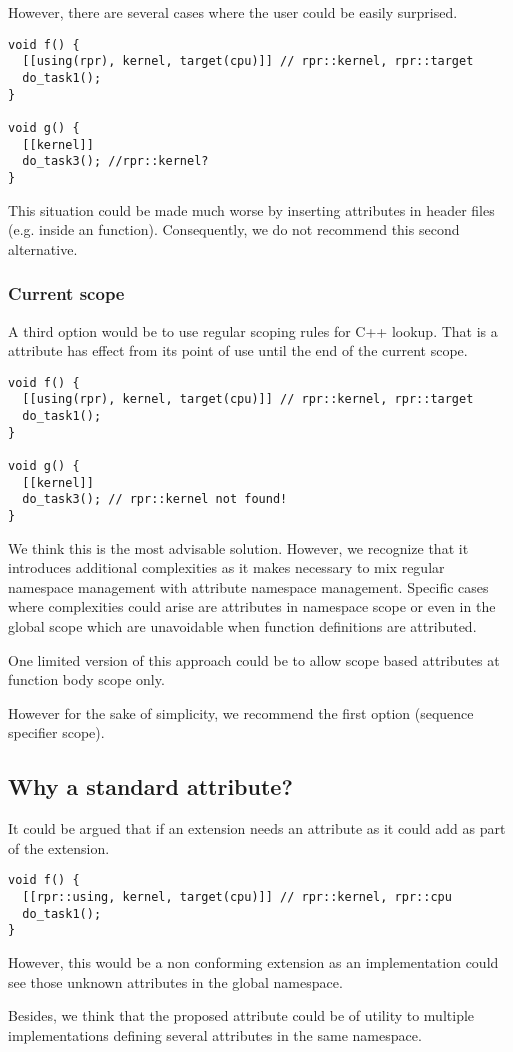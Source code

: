 However, there are several cases where the user could be easily surprised.

\begin{lstlisting}
void f() {
  [[using(rpr), kernel, target(cpu)]] // rpr::kernel, rpr::target
  do_task1();
}

void g() {
  [[kernel]]
  do_task3(); //rpr::kernel?
}
\end{lstlisting}

This situation could be made much worse by inserting  attributes
in header files (e.g. inside an  function). Consequently, we
do not recommend this second alternative.

\subsubsection{Current scope}

A third option would be to use regular scoping rules for C++ lookup. That is
a  attribute has effect from its point of use until the end of
the current scope.

\begin{lstlisting}
void f() {
  [[using(rpr), kernel, target(cpu)]] // rpr::kernel, rpr::target
  do_task1();
}

void g() {
  [[kernel]]
  do_task3(); // rpr::kernel not found!
}
\end{lstlisting}

We think this is the most advisable solution. However, we recognize that it introduces
additional complexities as it makes necessary to mix regular namespace management
with attribute namespace management. Specific cases where complexities could arise
are attributes in namespace scope or even in the global scope 
which are unavoidable when function definitions are attributed.

One limited version of this approach could be to allow scope based 
attributes at function body scope only.

However for the sake of simplicity, we recommend the first option (sequence specifier scope).

\subsection{Why a standard attribute?}

It could be argued that if an extension needs an attribute as  it could add
as part of the extension.

\begin{lstlisting}
void f() {
  [[rpr::using, kernel, target(cpu)]] // rpr::kernel, rpr::cpu
  do_task1();
}
\end{lstlisting}

However, this would be a non conforming extension as an implementation could see those
unknown attributes in the global namespace.

Besides, we think that the proposed  attribute could be of utility to
multiple implementations defining several attributes in the same namespace.
